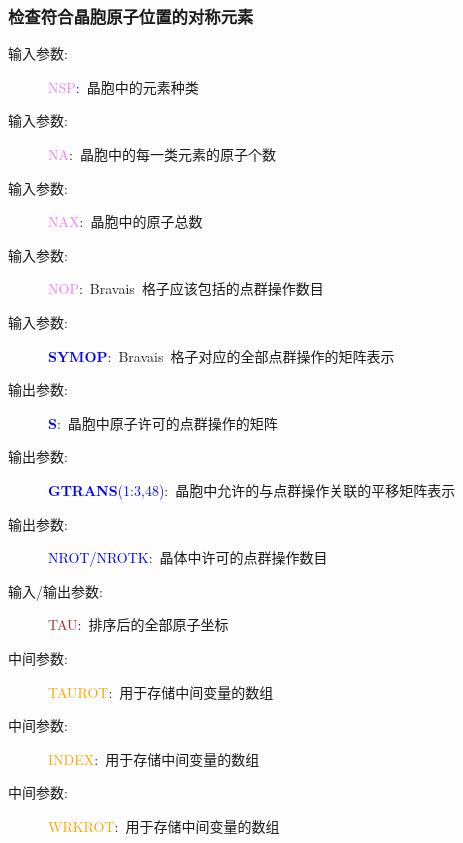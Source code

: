 \documentclass{article}      %
\begin{document}
\subsubsection{检查符合晶胞原子位置的对称元素}\label{tag:CHKSYM}
\begin{description}
	\item[输入参数:~]\textcolor{violet}{\textrm{NSP}}:~晶胞中的元素种类
	\item[输入参数:~]\textcolor{violet}{\textrm{NA}}:~晶胞中的每一类元素的原子个数
	\item[输入参数:~]\textcolor{violet}{\textrm{NAX}}:~晶胞中的原子总数
	\item[输入参数:~]\textcolor{violet}{\textrm{NOP}}:~\textrm{Bravais~}格子应该包括的点群操作数目
	\item[输入参数:~]\textcolor{blue}{\textbf{SYMOP}}:~\textrm{Bravais~}格子对应的全部点群操作的矩阵表示
	\item[输出参数:~]\textcolor{blue}{\textbf{S}}:~晶胞中原子许可的点群操作的矩阵
	\item[输出参数:~]\textcolor{blue}{\textbf{GTRANS}(1:3,48)}:~晶胞中允许的与点群操作关联的平移矩阵表示
	\item[输出参数:~]\textcolor{blue}{\textrm{NROT/NROTK}}:~晶体中许可的点群操作数目
	\item[输入/输出参数:~]\textcolor{brown}{\textrm{TAU}}:~排序后的全部原子坐标
	\item[中间参数:~]\textcolor{orange}{\textrm{TAUROT}}:~用于存储中间变量的数组
	\item[中间参数:~]\textcolor{orange}{\textrm{INDEX}}:~用于存储中间变量的数组
	\item[中间参数:~]\textcolor{orange}{\textrm{WRKROT}}:~用于存储中间变量的数组
\end{description}
\end{document}
